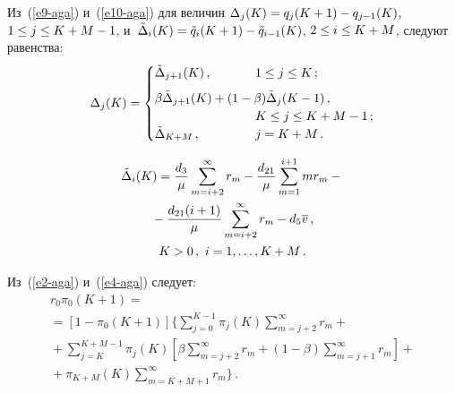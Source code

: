 \begin{multicols}{2}
  Из~(\ref{e9-aga}) и~(\ref{e10-aga}) для величин $\Delta_j(K)\hm= 
q_j(K+1)\hm- q_{j-1}(K)$, $1\hm\leq j\hm\leq K\hm+M\hm-1$, 
и~$\tilde{\Delta}_i(K)\hm= \tilde{q}_i (K+1) \hm- \tilde{q}_{i-1}(K)$, $2\hm\leq 
i\hm\leq K\hm+M$, следуют равенства:
  $$
  \Delta_j(K)=\begin{cases}
  \tilde{\Delta}_{j+1}(K)\,, & 1\leq j\leq K\,;\\[6pt]
  \beta\tilde{\Delta}_{j+1}(K)+(1-\beta) \tilde{\Delta}_j(K-1)\,,\hspace*{-70pt}\\
& K\leq j\leq K+M-1\,;\\
  \tilde{\Delta}_{K+M}\,, &j=K+M\,.
  \end{cases}
  $$
  
  \noindent
  \begin{multline}
  \tilde{\Delta}_i(K) =\displaystyle\frac{\displaystyle d_3\mathstrut}{\displaystyle \mu\mathstrut} \sum\limits^\infty_{m=i+2} r_m -
\displaystyle\frac{\displaystyle d_{21}\mathstrut}{\displaystyle \mu\mathstrut} \sum\limits_{m=1}^{i+1} m r_m-{}\\
{}-\displaystyle\frac{\displaystyle d_{21}(i+1)\mathstrut}{\displaystyle \mu\mathstrut} 
\sum\limits^\infty_{m=i+2} r_m- d_5 \overline{v}\,,\\
 K>0\,,\ i=1,\ldots , 
K+M\,.
  \label{e11-aga} 
\end{multline}
  
  Из~(\ref{e2-aga}) и~(\ref{e4-aga}) следует:
  \begin{multline}
  r_0\pi_0(K+1)={}\\
  {}=\left[ 1-\pi_0 (K+1)\right] \Bigg \{ 
  \sum\limits_{j=0}^{K-1} \pi_j(K)\! \sum\limits^\infty_{m=j+2} \! r_m+{}%
  \\
  {}+\sum\limits_{j=K}^{K+M-1} \pi_j(K) \left[ \beta \sum\limits^\infty_{m=j+2} 
\! r_m+(1-\beta)\! \sum\limits^\infty_{m=j+1}\! r_m\right]+{}\\
  {}+\pi_{K+M}(K)\sum\limits^\infty_{m=K+M+1}\! r_m\Bigg\}\,.
  \label{e12-aga}
  \end{multline}
  
\begin{figure*}[b] %
\vspace*{1pt}
\begin{minipage}[c]{80mm}
 \begin{center}
 \mbox{%
 \epsfxsize=75.253mm 
 }
 \end{center}
   \vspace*{-9pt}
\end{minipage}
\hfill
%
\begin{minipage}[c]{80mm}
\vspace*{1pt}
 \begin{center}
 \mbox{%
 \epsfxsize=75.253mm 
 }
 \end{center}
   \vspace*{-9pt}
\end{minipage}
\end{figure*}
  

\end{multicols}
